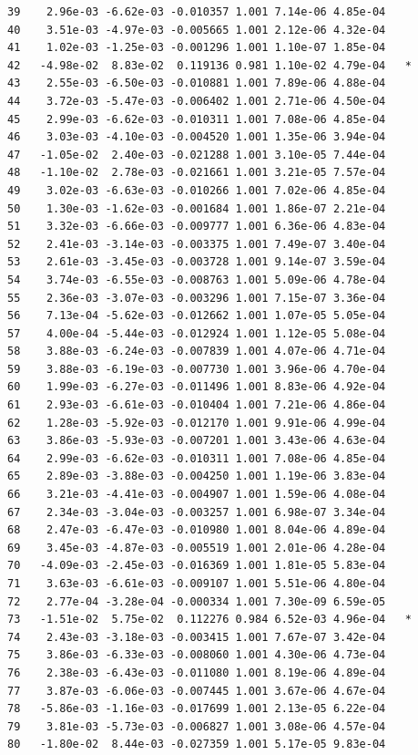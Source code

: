 \documentclass[
  letterpaper,
  DIV=11,
  numbers=noendperiod]{scrartcl}
\begin{document}
\begin{verbatim}
39    2.96e-03 -6.62e-03 -0.010357 1.001 7.14e-06 4.85e-04    
40    3.51e-03 -4.97e-03 -0.005665 1.001 2.12e-06 4.32e-04    
41    1.02e-03 -1.25e-03 -0.001296 1.001 1.10e-07 1.85e-04    
42   -4.98e-02  8.83e-02  0.119136 0.981 1.10e-02 4.79e-04   *
43    2.55e-03 -6.50e-03 -0.010881 1.001 7.89e-06 4.88e-04    
44    3.72e-03 -5.47e-03 -0.006402 1.001 2.71e-06 4.50e-04    
45    2.99e-03 -6.62e-03 -0.010311 1.001 7.08e-06 4.85e-04    
46    3.03e-03 -4.10e-03 -0.004520 1.001 1.35e-06 3.94e-04    
47   -1.05e-02  2.40e-03 -0.021288 1.001 3.10e-05 7.44e-04    
48   -1.10e-02  2.78e-03 -0.021661 1.001 3.21e-05 7.57e-04    
49    3.02e-03 -6.63e-03 -0.010266 1.001 7.02e-06 4.85e-04    
50    1.30e-03 -1.62e-03 -0.001684 1.001 1.86e-07 2.21e-04    
51    3.32e-03 -6.66e-03 -0.009777 1.001 6.36e-06 4.83e-04    
52    2.41e-03 -3.14e-03 -0.003375 1.001 7.49e-07 3.40e-04    
53    2.61e-03 -3.45e-03 -0.003728 1.001 9.14e-07 3.59e-04    
54    3.74e-03 -6.55e-03 -0.008763 1.001 5.09e-06 4.78e-04    
55    2.36e-03 -3.07e-03 -0.003296 1.001 7.15e-07 3.36e-04    
56    7.13e-04 -5.62e-03 -0.012662 1.001 1.07e-05 5.05e-04    
57    4.00e-04 -5.44e-03 -0.012924 1.001 1.12e-05 5.08e-04    
58    3.88e-03 -6.24e-03 -0.007839 1.001 4.07e-06 4.71e-04    
59    3.88e-03 -6.19e-03 -0.007730 1.001 3.96e-06 4.70e-04    
60    1.99e-03 -6.27e-03 -0.011496 1.001 8.83e-06 4.92e-04    
61    2.93e-03 -6.61e-03 -0.010404 1.001 7.21e-06 4.86e-04    
62    1.28e-03 -5.92e-03 -0.012170 1.001 9.91e-06 4.99e-04    
63    3.86e-03 -5.93e-03 -0.007201 1.001 3.43e-06 4.63e-04    
64    2.99e-03 -6.62e-03 -0.010311 1.001 7.08e-06 4.85e-04    
65    2.89e-03 -3.88e-03 -0.004250 1.001 1.19e-06 3.83e-04    
66    3.21e-03 -4.41e-03 -0.004907 1.001 1.59e-06 4.08e-04    
67    2.34e-03 -3.04e-03 -0.003257 1.001 6.98e-07 3.34e-04    
68    2.47e-03 -6.47e-03 -0.010980 1.001 8.04e-06 4.89e-04    
69    3.45e-03 -4.87e-03 -0.005519 1.001 2.01e-06 4.28e-04    
70   -4.09e-03 -2.45e-03 -0.016369 1.001 1.81e-05 5.83e-04    
71    3.63e-03 -6.61e-03 -0.009107 1.001 5.51e-06 4.80e-04    
72    2.77e-04 -3.28e-04 -0.000334 1.001 7.30e-09 6.59e-05    
73   -1.51e-02  5.75e-02  0.112276 0.984 6.52e-03 4.96e-04   *
74    2.43e-03 -3.18e-03 -0.003415 1.001 7.67e-07 3.42e-04    
75    3.86e-03 -6.33e-03 -0.008060 1.001 4.30e-06 4.73e-04    
76    2.38e-03 -6.43e-03 -0.011080 1.001 8.19e-06 4.89e-04    
77    3.87e-03 -6.06e-03 -0.007445 1.001 3.67e-06 4.67e-04    
78   -5.86e-03 -1.16e-03 -0.017699 1.001 2.13e-05 6.22e-04    
79    3.81e-03 -5.73e-03 -0.006827 1.001 3.08e-06 4.57e-04    
80   -1.80e-02  8.44e-03 -0.027359 1.001 5.17e-05 9.83e-04    

\end{verbatim}
\end{document}

